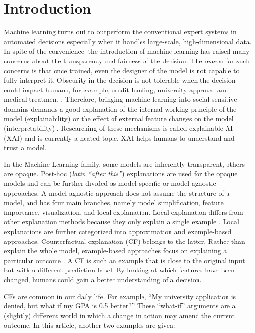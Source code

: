 \section{Introduction}
Machine learning turns out to outperform the conventional expert systems in automated decisions especially when it handles large-scale, high-dimensional data. In spite of the convenience, the introduction of machine learning has raised many concerns about the transparency and fairness of the decision. The reason for such concerns is that once trained, even the designer of the model is not capable to fully interpret it. Obscurity in the decision is not tolerable when the decision could impact humans, for example, credit lending, university approval and medical treatment \cite{CFReview}. Therefore, bringing machine learning into social sensitive domains demands a good explanation of the internal working principle of the model (explainability) or the effect of external feature changes on the model (interpretability) \cite{XAIBook}.
Researching of these mechanisms is called explainable AI (XAI) and is currently a heated topic. XAI helps humans to understand and trust a model.

In the Machine Learning family, some models are inherently transparent, others are opaque. Post-hoc (\emph{latin ``after this''}) explanations are used for the opaque models and can be further divided as model-specific or model-agnostic approaches. A model-agnostic approach does not assume the structure of a model, and has four main branches, namely model simplification, feature importance, visualization, and local explanation. Local explanation differs from other explanation methods because they only explain a single example \cite{CFReview}. Local explanations are further categorized into approximation and example-based approaches. Counterfactual explanation (CF) belongs to the latter. Rather than explain the whole model, example-based approaches focus on explaining a particular outcome \cite{CFReview}. A CF is such an example that is close to the original input but with a different prediction label. By looking at which features have been changed, humans could gain a better understanding of a decision.

CFs are common in our daily life. For example, ``My university application is denied, but what if my GPA is 0.5 better?'' These ``what-if'' arguments are a (slightly) different world in which a change in action may amend the current outcome. In this article, another two examples are given:

